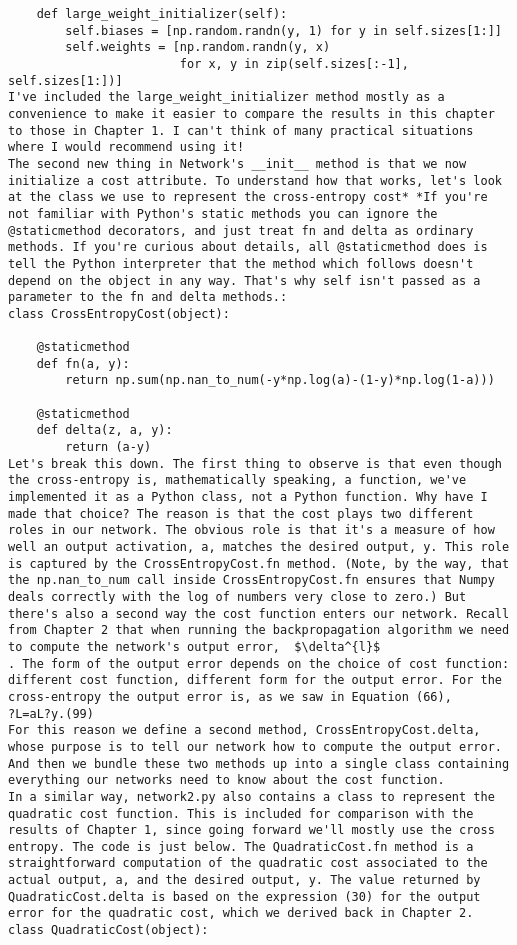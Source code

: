 \begin{lstlisting}
    def large_weight_initializer(self):
        self.biases = [np.random.randn(y, 1) for y in self.sizes[1:]]
        self.weights = [np.random.randn(y, x) 
                        for x, y in zip(self.sizes[:-1], self.sizes[1:])]
I've included the large_weight_initializer method mostly as a convenience to make it easier to compare the results in this chapter to those in Chapter 1. I can't think of many practical situations where I would recommend using it!
The second new thing in Network's __init__ method is that we now initialize a cost attribute. To understand how that works, let's look at the class we use to represent the cross-entropy cost* *If you're not familiar with Python's static methods you can ignore the @staticmethod decorators, and just treat fn and delta as ordinary methods. If you're curious about details, all @staticmethod does is tell the Python interpreter that the method which follows doesn't depend on the object in any way. That's why self isn't passed as a parameter to the fn and delta methods.:
class CrossEntropyCost(object):

    @staticmethod
    def fn(a, y):
        return np.sum(np.nan_to_num(-y*np.log(a)-(1-y)*np.log(1-a)))

    @staticmethod
    def delta(z, a, y):
        return (a-y)
Let's break this down. The first thing to observe is that even though the cross-entropy is, mathematically speaking, a function, we've implemented it as a Python class, not a Python function. Why have I made that choice? The reason is that the cost plays two different roles in our network. The obvious role is that it's a measure of how well an output activation, a, matches the desired output, y. This role is captured by the CrossEntropyCost.fn method. (Note, by the way, that the np.nan_to_num call inside CrossEntropyCost.fn ensures that Numpy deals correctly with the log of numbers very close to zero.) But there's also a second way the cost function enters our network. Recall from Chapter 2 that when running the backpropagation algorithm we need to compute the network's output error,  $\delta^{l}$
. The form of the output error depends on the choice of cost function: different cost function, different form for the output error. For the cross-entropy the output error is, as we saw in Equation (66),
?L=aL?y.(99)
For this reason we define a second method, CrossEntropyCost.delta, whose purpose is to tell our network how to compute the output error. And then we bundle these two methods up into a single class containing everything our networks need to know about the cost function.
In a similar way, network2.py also contains a class to represent the quadratic cost function. This is included for comparison with the results of Chapter 1, since going forward we'll mostly use the cross entropy. The code is just below. The QuadraticCost.fn method is a straightforward computation of the quadratic cost associated to the actual output, a, and the desired output, y. The value returned by QuadraticCost.delta is based on the expression (30) for the output error for the quadratic cost, which we derived back in Chapter 2.
class QuadraticCost(object):


\end{lstlisting}
